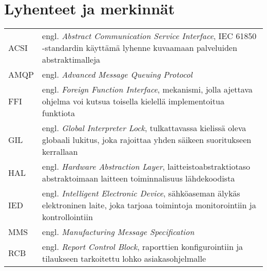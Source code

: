 \chapter*{Lyhenteet ja merkinnät}
\label{ch:lyhenteetjamerkinnat}

\begin{tabular}[h]{@{} p{} p{} @{}}
	ACSI & engl. \emph{Abstract Communication Service Interface}, IEC 61850 -standardin käyttämä lyhenne kuvaamaan palveluiden abstraktimalleja \\
	AMQP & engl. \emph{Advanced Message Queuing Protocol} \\
	FFI & engl. \emph{Foreign Function Interface}, mekanismi, jolla ajettava ohjelma voi kutsua toisella kielellä implementoitua funktiota\\
	GIL & engl. \emph{Global Interpreter Lock}, tulkattavassa kielissä oleva globaali lukitus, joka rajoittaa yhden säikeen suoritukseen kerrallaan \\
	HAL & engl. \emph{Hardware Abstraction Layer}, laitteistoabstraktiotaso abstraktoimaan laitteen toiminnalisuus lähdekoodista \\
	IED & engl. \emph{Intelligent Electronic Device}, sähköaseman älykäs elektroninen laite, joka tarjoaa toimintoja monitorointiin ja kontrollointiin \\
	MMS & engl. \emph{Manufacturing Message Specification} \\
	RCB & engl. \emph{Report Control Block}, raporttien konfigurointiin ja tilaukseen tarkoitettu lohko asiakasohjelmalle \\
\end{tabular}